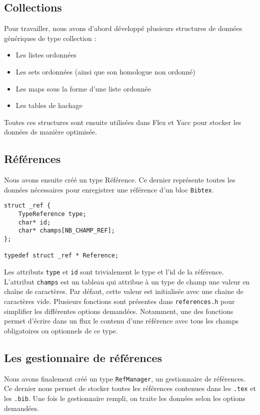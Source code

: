 \documentclass[hidelinks, a4paper,11pt,twoside,final]{article}
\begin{document}
\subsection{Collections}
Pour travailler, nous avons d'abord développé plusieurs structures de données génériques de type collection :
\begin{itemize}
 \item Les listes ordonnées 
 \item Les sets ordonnées (ainsi que son homologue non ordonné)
 \item Les maps sous la forme d'une liste ordonnée 
 \item Les tables de hachage
\end{itemize}
Toutes ces structures sont ensuite utilisées dans Flex et Yacc pour stocker les données de manière optimisée.

\subsection{Références}
Nous avons ensuite créé un type Référence. Ce dernier représente toutes les données nécessaires pour enregistrer une référence d'un bloc \texttt{Bibtex}.
\begin{lstlisting}
struct _ref {
    TypeReference type;
    char* id;
    char* champs[NB_CHAMP_REF];
};

typedef struct _ref * Reference;
\end{lstlisting}

Les attributs \texttt{type} et \texttt{id} sont trivialement le type et l'id de la référence.
L'attribut \texttt{champs} est un tableau qui attribue à un type de champ une valeur en chaîne de caractères.
Par défaut, cette valeur est initialisée avec une chaine de caractères vide.
Plusieurs fonctions sont présentes dans \texttt{references.h} pour simplifier les différentes options demandées.
Notamment, une des fonctions permet d'écrire dans un flux le contenu d'une référence avec tous les champs obligatoires ou optionnels de ce type.

\subsection {Les gestionnaire de références}
Nous avons finalement créé un type \texttt{RefManager}, un gestionnaire de références.
Ce dernier nous permet de stocker toutes les références contenues dans les \texttt{.tex} et les \texttt{.bib}. 
Une fois le gestionnaire rempli, on traite les données selon les options demandées.
\end{document}
